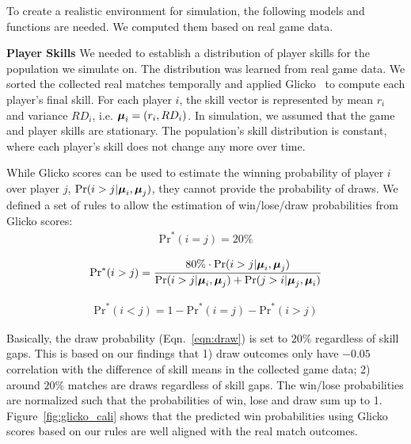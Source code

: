 To create a realistic environment for simulation, the following models and functions are needed. We computed them based on real game data.

\textbf{Player Skills} We needed to establish a distribution of player skills for the population we simulate on. The distribution was learned from real game data. We sorted the collected real matches temporally and applied Glicko~\citep{glickman1999parameter} to compute each player's final skill. For each player $i$, the skill vector is represented by mean $r_i$ and variance $RD_i$, i.e. $\boldsymbol{\mu}_i = (r_i, RD_i)$. In simulation, we assumed that the game and player skills are stationary. The population's skill distribution is constant, where each player's skill does not change any more over time.


While Glicko scores can be used to estimate the winning probability of player $i$ over player $j$, $\Pr(i > j | \boldsymbol{\mu}_i, \boldsymbol{\mu}_j)$, they cannot provide the probability of draws. We defined a set of rules to allow the estimation of win/lose/draw probabilities from Glicko scores:
\begin{align}\label{eqn:draw}
\text{Pr}^*(i=j) = 20\%
\end{align}

\begin{align}
\text{Pr}^*(i>j)  = \frac{80\% \cdot \Pr(i > j | \boldsymbol{\mu}_i, \boldsymbol{\mu}_j)}{\Pr(i > j | \boldsymbol{\mu}_i, \boldsymbol{\mu}_j) + \Pr(j > i | \boldsymbol{\mu}_j, \boldsymbol{\mu}_i) }
\end{align}

\begin{align}
\text{Pr}^*(i<j) = 1 - \text{Pr}^*(i=j) - \text{Pr}^*(i>j)
\end{align}

Basically, the draw probability (Eqn.~\ref{eqn:draw}) is set to $20\%$ regardless of skill gaps. This is based on our findings that 1) draw outcomes only have $-0.05$ correlation with the difference of skill means in the collected game data; 2) around $20\%$ matches are draws regardless of skill gaps. The win/lose probabilities are normalized such that the probabilities of win, lose and draw sum up to 1. Figure~\ref{fig:glicko_cali} shows that the predicted win probabilities using Glicko scores based on our rules are well aligned with the real match outcomes.

